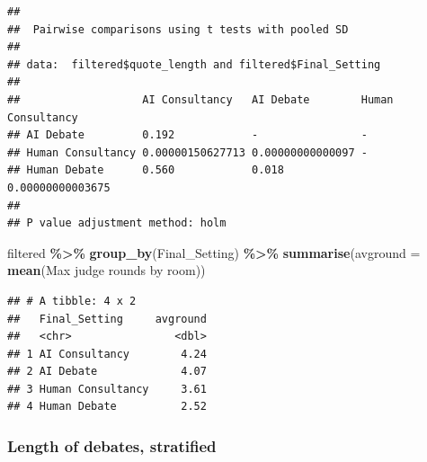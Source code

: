 \documentclass[
]{article}
\newenvironment{Shaded}{\begin{snugshade}}{\end{snugshade}}
\newcommand{\AttributeTok}[1]{\textcolor[rgb]{0.13,0.29,0.53}{#1}}
\newcommand{\FunctionTok}[1]{\textcolor[rgb]{0.13,0.29,0.53}{\textbf{#1}}}
\newcommand{\NormalTok}[1]{#1}
\newcommand{\SpecialCharTok}[1]{\textcolor[rgb]{0.81,0.36,0.00}{\textbf{#1}}}
\newcommand{\StringTok}[1]{\textcolor[rgb]{0.31,0.60,0.02}{#1}}
\begin{document}
\begin{Shaded}
\end{Shaded}

\begin{verbatim}
## 
##  Pairwise comparisons using t tests with pooled SD 
## 
## data:  filtered$quote_length and filtered$Final_Setting 
## 
##                   AI Consultancy   AI Debate        Human Consultancy
## AI Debate         0.192            -                -                
## Human Consultancy 0.00000150627713 0.00000000000097 -                
## Human Debate      0.560            0.018            0.00000000003675 
## 
## P value adjustment method: holm
\end{verbatim}

\begin{Shaded}
\begin{Highlighting}[]
\NormalTok{filtered }\SpecialCharTok{\%\textgreater{}\%} \FunctionTok{group\_by}\NormalTok{(Final\_Setting) }\SpecialCharTok{\%\textgreater{}\%} \FunctionTok{summarise}\NormalTok{(}\AttributeTok{avground =} \FunctionTok{mean}\NormalTok{(}\StringTok{\textasciigrave{}}\AttributeTok{Max judge rounds by room}\StringTok{\textasciigrave{}}\NormalTok{))}
\end{Highlighting}
\end{Shaded}

\begin{verbatim}
## # A tibble: 4 x 2
##   Final_Setting     avground
##   <chr>                <dbl>
## 1 AI Consultancy        4.24
## 2 AI Debate             4.07
## 3 Human Consultancy     3.61
## 4 Human Debate          2.52
\end{verbatim}

\subsubsection{Length of debates,
stratified}\label{length-of-debates-stratified}
\end{document}
